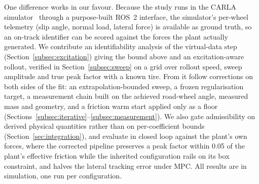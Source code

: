 One difference works in our favour. Because the study runs in the CARLA
simulator~\cite{carla2017} through a purpose-built ROS~2 interface, the
simulator's per-wheel telemetry (slip angle, normal load, lateral force) is
available as ground truth, so an on-track identifier can be scored against the
forces the plant actually generated. We contribute an identifiability analysis
of the virtual-data step (Section~\ref{subsec:excitation}) giving the bound
above and an excitation-aware rollout, verified in Section~\ref{subsec:sweep}
on a grid over rollout speed, sweep amplitude and true peak factor with a
known tire. From it follow corrections on both sides of the fit: an
extrapolation-bounded sweep, a frozen regularisation target, a measurement
chain built on the achieved road-wheel angle, measured mass and geometry, and
a friction warm start applied only as a floor
(Sections~\ref{subsec:iterative}--\ref{subsec:measurement}). We also gate
admissibility on derived physical quantities rather than on per-coefficient
bounds (Section~\ref{sec:integration}), and evaluate in closed loop against
the plant's own forces, where the corrected pipeline preserves a peak factor
within \num{0.05} of the plant's effective friction while the inherited
configuration rails on its box constraint, and halves the lateral tracking
error under MPC. All results are in simulation, one run per configuration.
